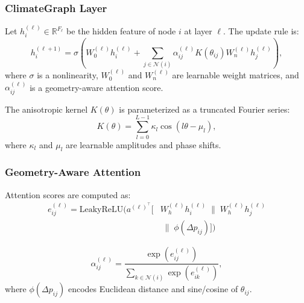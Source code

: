 \documentclass{article}
\theoremstyle{plain}
\theoremstyle{definition}
\theoremstyle{remark}
\begin{document}
\subsubsection{ClimateGraph Layer}
Let $h_i^{(\ell)} \in \mathbb{R}^{F_\ell}$ be the hidden feature of node $i$ at layer $\ell$. The update rule is:
\begin{equation}
h_i^{(\ell+1)} = \sigma \left( W_0^{(\ell)} h_i^{(\ell)} 
+ \sum_{j \in \mathcal{N}(i)} \alpha_{ij}^{(\ell)} K(\theta_{ij}) W_n^{(\ell)} h_j^{(\ell)} \right),
\end{equation}
where $\sigma$ is a nonlinearity, $W_0^{(\ell)}$ and $W_n^{(\ell)}$ are learnable weight matrices, and $\alpha_{ij}^{(\ell)}$ is a geometry-aware attention score.

The anisotropic kernel $K(\theta)$ is parameterized as a truncated Fourier series:
\begin{equation}
K(\theta) = \sum_{l=0}^{L-1} \kappa_l \cos(l\theta - \mu_l),
\end{equation}
where $\kappa_l$ and $\mu_l$ are learnable amplitudes and phase shifts.

\subsubsection{Geometry-Aware Attention}
Attention scores are computed as:
\begin{equation}
\begin{aligned}
e_{ij}^{(\ell)} = \mathrm{LeakyReLU}\Big(
a^{(\ell)^\top}
\big[
& W_h^{(\ell)} h_i^{(\ell)} \;\| \;
W_h^{(\ell)} h_j^{(\ell)} \\
& \;\| \; \phi(\Delta p_{ij})
\big]
\Big)
\end{aligned}
\end{equation}

\begin{equation}
\alpha_{ij}^{(\ell)} = \frac{\exp(e_{ij}^{(\ell)})}{\sum_{k \in \mathcal{N}(i)} \exp(e_{ik}^{(\ell)})},
\end{equation}
where $\phi(\Delta p_{ij})$ encodes Euclidean distance and sine/cosine of $\theta_{ij}$. 

\end{document}
